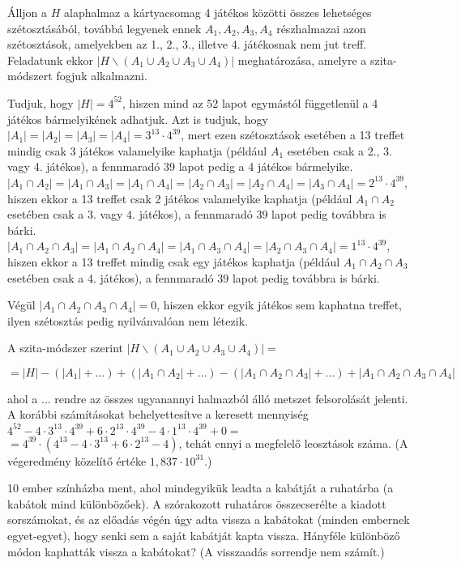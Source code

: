 \begin{solution}
Álljon a $H$ alaphalmaz a kártyacsomag 4 játékos közötti összes lehetséges
szétosztásából, továbbá legyenek ennek $A_{1},A_{2},A_{3},A_{4}$
részhalmazai azon szétosztások, amelyekben az 1., 2., 3., illetve
4. játékosnak nem jut treff. Feladatunk ekkor $\left|H\backslash\left(A_{1}\cup A_{2}\cup A_{3}\cup A_{4}\right)\right|$
meghatározása, amelyre a szita-módszert fogjuk alkalmazni.

Tudjuk, hogy $|H|=4^{52}$, hiszen mind az 52 lapot egymástól függetlenül
a 4 játékos bármelyikének adhatjuk. Azt is tudjuk, hogy $\left|A_{1}\right|=\left|A_{2}\right|=\left|A_{3}\right|=\left|A_{4}\right|=3^{13}\cdot4^{39}$,
mert ezen szétosztások esetében a 13 treffet mindig csak 3 játékos
valamelyike kaphatja (például $A_{1}$ esetében csak a 2., 3. vagy
4. játékos), a fennmaradó 39 lapot pedig a 4 játékos bármelyike.\\
 $\left|A_{1}\cap A_{2}\right|=\left|A_{1}\cap A_{3}\right|=\left|A_{1}\cap A_{4}\right|=\left|A_{2}\cap A_{3}\right|=\left|A_{2}\cap A_{4}\right|=\left|A_{3}\cap A_{4}\right|=2^{13}\cdot4^{39}$,
hiszen ekkor a 13 treffet csak 2 játékos valamelyike kaphatja (például
$A_{1}\cap A_{2}$ esetében csak a 3. vagy 4. játékos), a fennmaradó
39 lapot pedig továbbra is bárki.\\
 $\left|A_{1}\cap A_{2}\cap A_{3}\right|=\left|A_{1}\cap A_{2}\cap A_{4}\right|=\left|A_{1}\cap A_{3}\cap A_{4}\right|=\left|A_{2}\cap A_{3}\cap A_{4}\right|=1^{13}\cdot4^{39}$,
hiszen ekkor a 13 treffet mindig csak egy játékos kaphatja (például
$A_{1}\cap A_{2}\cap A_{3}$ esetében csak a 4. játékos), a fennmaradó
39 lapot pedig továbbra is bárki.

Végül $\left|A_{1}\cap A_{2}\cap A_{3}\cap A_{4}\right|=0$, hiszen
ekkor egyik játékos sem kaphatna treffet, ilyen szétosztás pedig nyilvánvalóan
nem létezik.

A szita-módszer szerint $\left|H\backslash\left(A_{1}\cup A_{2}\cup A_{3}\cup A_{4}\right)\right|=$

\[
=|H|-\left(\left|A_{1}\right|+\ldots\right)+\left(\left|A_{1}\cap A_{2}\right|+\ldots\right)-\left(\left|A_{1}\cap A_{2}\cap A_{3}\right|+\ldots\right)+\left|A_{1}\cap A_{2}\cap A_{3}\cap A_{4}\right|
\]

ahol a ... rendre az összes ugyanannyi halmazból álló metszet felsorolását
jelenti. A korábbi számításokat behelyettesítve a keresett mennyiség
$4^{52}-4\cdot3^{13}\cdot4^{39}+6\cdot2^{13}\cdot4^{39}-4\cdot1^{13}\cdot4^{39}+0=$
$=4^{39}\cdot\left(4^{13}-4\cdot3^{13}+6\cdot2^{13}-4\right)$, tehát
ennyi a megfelelő leosztások száma. (A végeredmény közelítő értéke
$1,837\cdot10^{31}$.) 
\end{solution}
\begin{extraproblem}
10 ember színházba ment, ahol mindegyikük leadta a kabátját a ruhatárba
(a kabátok mind különbözőek). A szórakozott ruhatáros összecserélte
a kiadott sorszámokat, és az előadás végén úgy adta vissza a kabátokat
(minden embernek egyet-egyet), hogy senki sem a saját kabátját kapta
vissza. Hányféle különböző módon kaphatták vissza a kabátokat? (A
visszaadás sorrendje nem számít.) 
\end{extraproblem}

